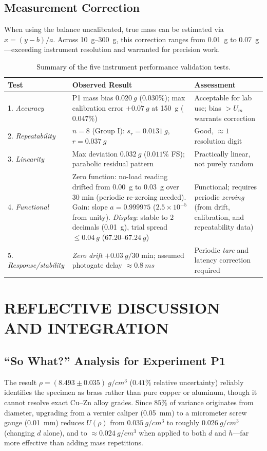 \documentclass[a4paper, 12pt]{article}
\begin{document}
        \subsection{Measurement Correction}
        When using the balance uncalibrated, true mass can be estimated via $x=(y-b)/a$. Across \SIrange{10}{300}{g}, this correction ranges from \SI{0.01}{g} to \SI{0.07}{g}—exceeding instrument resolution and warranted for precision work.
\begin{table}[H]
\centering
\singlespacing
\caption{Summary of the five instrument performance validation tests.}
\label{tab:valid}
\small
\begin{tabularx}{\textwidth}{@{}l X X@{}}
\toprule
\textbf{Test} & \textbf{Observed Result} & \textbf{Assessment}\\
\midrule
1. \textit{Accuracy} & P1 mass bias $\SI{0.020}{g}$ ($0.030\%$); max calibration error $+\SI{0.07}{g}$ at \SI{150}{g} ($0.047\%$) & Acceptable for lab use; bias $>U_m$ warrants correction\\
2. \textit{Repeatability} & $n=8$ (Group I): $s_r=\SI{0.0131}{g}$, $r=\SI{0.037}{g}$ & Good, $\approx 1$ resolution digit\\
3. \textit{Linearity} & Max deviation $\SI{0.032}{g}$ ($0.011\%$ FS); parabolic residual pattern & Practically linear, not purely random\\
4. \textit{Functional} & Zero function: no-load reading drifted from \SI{0.00}{g} to \SI{0.03}{g} over $30$ min (periodic re-zeroing needed). Gain: slope $a=0.999975$ ($2.5\times10^{-5}$ from unity). \textit{Display}: stable to $2$ decimals (\SI{0.01}{g}), trial spread $\le\SI{0.04}{g}$ ($67.20\text{--}\SI{67.24}{g}$) & Functional; requires periodic \textit{zeroing} (from drift, calibration, and repeatability data)\\
5. \textit{Response/stability} & \textit{Zero drift} $+\SI{0.03}{g}/30$ min; assumed photogate delay $\approx\SI{0.8}{ms}$ & Periodic \textit{tare} and latency correction required\\
\bottomrule
\end{tabularx}
\end{table}

\section{REFLECTIVE DISCUSSION AND INTEGRATION}
        \subsection{``So What?'' Analysis for Experiment P1}
        The result $\rho=(8.493\pm0.035)\ \si{g/cm^3}$ ($0.41\%$ relative uncertainty) reliably identifies the specimen as brass rather than pure copper or aluminum, though it cannot resolve exact Cu--Zn alloy grades. Since $85\%$ of variance originates from diameter, upgrading from a vernier caliper (\SI{0.05}{mm}) to a micrometer screw gauge (\SI{0.01}{mm}) reduces $U(\rho)$ from $\SI{0.035}{g/cm^3}$ to roughly $\SI{0.026}{g/cm^3}$ (changing $d$ alone), and to $\approx\SI{0.024}{g/cm^3}$ when applied to both $d$ and $h$—far more effective than adding mass repetitions.
\end{document}
